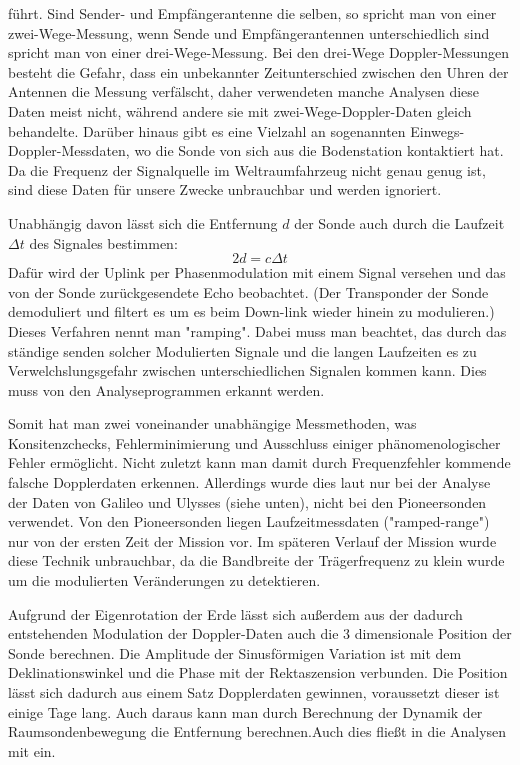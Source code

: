 führt.
Sind Sender- und Empfängerantenne die selben, so spricht man von einer zwei-Wege-Messung, wenn Sende und Empfängerantennen unterschiedlich sind spricht man von einer drei-Wege-Messung.\cite{Levy2009} Bei den drei-Wege Doppler-Messungen besteht die Gefahr, dass ein unbekannter Zeitunterschied zwischen den Uhren der Antennen die Messung verfälscht, daher verwendeten manche Analysen diese Daten meist nicht,\cite{Anderson2002} während andere sie mit zwei-Wege-Doppler-Daten gleich behandelte.\cite{Markwardt2002} Darüber hinaus gibt es eine Vielzahl an sogenannten Einwegs-Doppler-Messdaten, wo die Sonde von sich aus die Bodenstation kontaktiert hat. Da die Frequenz der Signalquelle im Weltraumfahrzeug nicht genau genug ist, sind diese Daten für unsere Zwecke unbrauchbar und werden ignoriert. %

Unabhängig davon lässt sich die Entfernung $d$ der Sonde auch durch die Laufzeit $\Delta t$ des Signales bestimmen:
\begin{equation}
 2d = c \Delta t
\end{equation}
Dafür wird der Uplink per Phasenmodulation mit einem Signal versehen und das von der Sonde zurückgesendete Echo beobachtet. (Der Transponder der Sonde demoduliert und filtert es um es beim Down-link wieder hinein zu modulieren.) Dieses Verfahren nennt man "ramping". %
Dabei muss man beachtet, das durch das ständige senden solcher Modulierten Signale und die langen Laufzeiten es zu Verwelchslungsgefahr zwischen unterschiedlichen Signalen kommen kann. Dies muss von den Analyseprogrammen erkannt werden.

Somit hat man zwei voneinander unabhängige Messmethoden, was Konsitenzchecks,
Fehlerminimierung und Ausschluss einiger phänomenologischer Fehler ermöglicht. Nicht zuletzt kann man damit durch Frequenzfehler kommende falsche Dopplerdaten erkennen.\cite{Anderson2002}
Allerdings wurde dies laut \cite{Anderson2002} nur bei der Analyse der Daten von Galileo und Ulysses (siehe unten), nicht bei den Pioneersonden verwendet. Von den Pioneersonden liegen Laufzeitmessdaten ("ramped-range") nur von der ersten Zeit der Mission vor. Im späteren Verlauf der Mission wurde diese Technik unbrauchbar, da die Bandbreite der Trägerfrequenz zu klein wurde um die modulierten Veränderungen zu detektieren.\cite{Turyshev2010} %

Aufgrund der Eigenrotation der Erde lässt sich außerdem aus der dadurch entstehenden Modulation der Doppler-Daten auch die 3 dimensionale Position der Sonde berechnen. Die Amplitude der Sinusförmigen Variation ist mit dem Deklinationswinkel und die Phase mit der Rektaszension verbunden. Die Position lässt sich dadurch aus einem Satz Dopplerdaten gewinnen, voraussetzt dieser ist einige Tage lang. Auch daraus kann man durch Berechnung der Dynamik der Raumsondenbewegung die Entfernung berechnen.Auch dies fließt in die Analysen mit ein.\cite{Anderson2002} %

